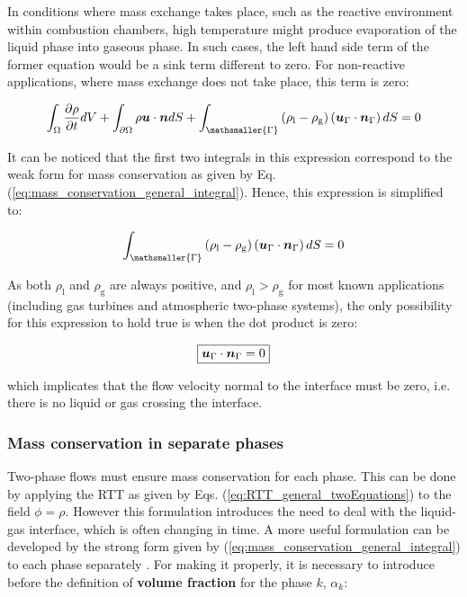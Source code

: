 In conditions where mass exchange takes place, such as the reactive environment within combustion chambers, high temperature might produce evaporation of the liquid phase into gaseous phase. In such cases, the left hand side term of the former equation would be a sink term different to zero. For non-reactive applications, where mass exchange does not take place, this term is zero:

\begin{equation}
\int_{\Omega}  \frac{\partial \rho}{\partial t}  dV + \int_{\partial \Omega} \rho \boldsymbol{u} \cdot \boldsymbol{n} dS + \int_\mathsmaller{\Gamma} \left( \rho_\mathrm{l} - \rho_\mathrm{g} \right) \left( \boldsymbol{u}_{\scriptsize{\Gamma}} \cdot \boldsymbol{n}_{\scriptsize{\Gamma}}\right) dS = 0
\end{equation}

It can be noticed that the first two integrals in this expression correspond to the weak form for mass conservation as given by Eq. (\ref{eq:mass_conservation_general_integral}). Hence, this expression is simplified to:

\begin{equation}
\int_\mathsmaller{\Gamma} \left( \rho_\mathrm{l} - \rho_\mathrm{g} \right) \left( \boldsymbol{u}_{\scriptsize{\Gamma}} \cdot \boldsymbol{n}_{\scriptsize{\Gamma}} \right) dS = 0
\end{equation}

As both $\rho_\mathrm{l}$ and $\rho_\mathrm{g}$ are always positive, and $\rho_\mathrm{l} > \rho_\mathrm{g}$ for most known applications (including gas turbines and atmospheric two-phase systems), the only possibility for this expression to hold true is when the dot product is zero:

\begin{equation}
\label{eq:continuity_TPF_noFluxThroughInterface}
\boxed{
\boldsymbol{u}_{\scriptsize{\Gamma}} \cdot \boldsymbol{n}_{\scriptsize{\Gamma}} = 0
}
\end{equation}

which implicates that the flow velocity normal to the interface must be zero, i.e. there is no liquid or gas crossing the interface. 

\subsubsection*{Mass conservation in separate phases}
	\label{eq:mass_conservation_separated_phases}

Two-phase flows must ensure mass conservation for each phase. This can be done by applying the RTT as given by Eqs. (\ref{eq:RTT_general_twoEquations}) to the field $\phi = \rho$. However this formulation introduces the need to deal with the liquid-gas interface, which is often changing in time. A more useful formulation can be developed by the strong form given by (\ref{eq:mass_conservation_general_integral}) to each phase separately . For making it properly, it is necessary to introduce before the definition of \textbf{volume fraction} for the phase $k$, $\alpha_k$:

